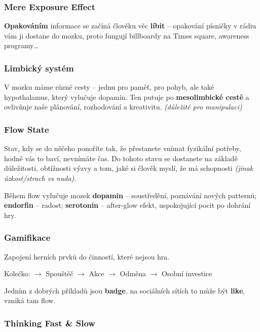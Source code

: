 \subsubsection*{Mere Exposure Effect}

\textbf{Opakováním} informace se začíná člověku věc \textbf{líbit} -- opakování písničky v rádiu vám ji dostane do mozku, proto fungují billboardy na Times square, awareness programy\ldots

\subsubsection*{Limbický systém}

V mozku máme různé cesty -- jednu pro paměť, pro pohyb, ale také hypothalamus, který vylučuje dopamin. Ten putuje po \textbf{mesolimbické cestě} a ovlivňuje naše plánování, rozhodování a kreativitu. \textit{(důležité pro manipulaci)}

\subsubsection*{Flow State}

Stav, kdy se do něčeho ponoříte tak, že přestanete vnímat fyzikální potřeby, hodně vás to baví, nevnímáte čas. Do tohoto stavu se dostanete na základě důležitosti, obtížnosti výzvy a tom, jaké si člověk myslí, že má schopnosti \textit{(jinak úzkost/strach vs nuda)}.

\vspace{4pt}
\noindent Během flow vylučuje mozek \textbf{dopamin} -- soustředění, poznávání nových patternů; \textbf{endorfin} -- radost; \textbf{serotonin} -- after-glow efekt, uspokojující pocit po dohrání hry.

\subsubsection*{Gamifikace}

Zapojení herních prvků do činností, které nejsou hra.

\vspace{4pt}
\noindent Kolečko: $\to$ Spouštěč $\to$ Akce $\to$ Odměna $\to$ Osobní investice

\vspace{4pt}
\noindent Jedním z dobrých příkladů jsou \textbf{badge}, na sociálních sítích to může být \textbf{like}, vzniká tam flow.

\subsubsection*{Thinking Fast \& Slow}

